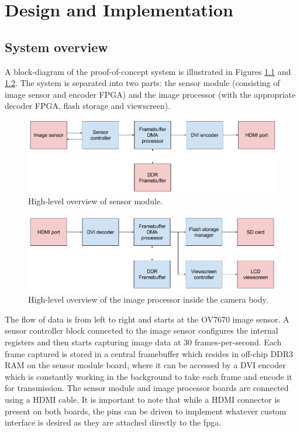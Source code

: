 \chapter{Design and Implementation}

\section{System overview}

A block-diagram of the proof-of-concept system is illustrated in Figures \ref{fig:sensor_module_diagram} and \ref{fig:image_processor_diagram}. The system is separated into two parts: the sensor module (consisting of image sensor and encoder FPGA) and the image processor (with the appropriate decoder FPGA, flash storage and viewscreen).

\begin{figure}
  \centering
  \includegraphics[width=1\textwidth]{./img/sensor_module_diagram.png}
  \caption{High-level overview of sensor module.}
  \label{fig:sensor_module_diagram}
\end{figure}

\begin{figure}
  \centering
  \includegraphics[width=1\textwidth]{./img/image_processor_diagram.png}
  \caption{High-level overview of the image processor inside the camera body.}
  \label{fig:image_processor_diagram}
\end{figure}

The flow of data is from left to right and starts at the OV7670 image sensor. A sensor controller block connected to the image sensor configures the internal registers and then starts capturing image data at 30 frames-per-second. Each frame captured is stored in a central framebuffer which resides in off-chip DDR3 RAM on the sensor module board, where it can be accessed by a DVI encoder which is constantly working in the background to take each frame and encode it for transmission. The sensor module and image processor boards are connected using a HDMI cable. It is important to note that while a HDMI connector is present on both boards, the pins can be driven to implement whatever custom interface is desired as they are attached directly to the \gls{fpga}.

